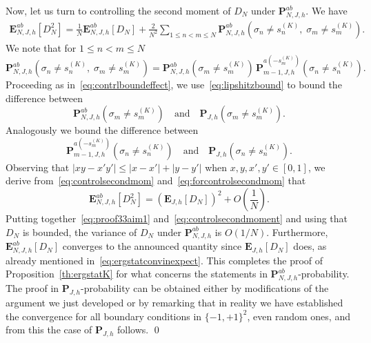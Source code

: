 \documentclass[AHL,Unicode,longabstracts,published]{cedram}
\newcommand{\bP}{\mathbf{P}}
\newcommand{\bE}{\mathbf{E}}
\newcommand{\gs}{\sigma}
\begin{document}
Now, let us turn to controlling the second moment of $D_N$ under $\bP^{ab}_{ N, J, h}$. We have
\begin{equation}\label{eq:controlsecondmom}
\begin{aligned}
\bE^{ab}_{N, J, h}\left[D_N^2\right]=\frac1N\bE^{ab}_{N, J, h}[D_N]+\frac2{N^2}\sum_{1 \le n < m\le N} \bP^{ab}_{N, J, h}\left(\gs_n \neq s^{(K)}_n,\; \gs_m \neq s^{(K)}_m\right).
\end{aligned}
\end{equation}
We note that for $1 \le n < m\le N$
\begin{equation}\label{eq:forcontrolsecondmom}
\bP_{ N, J, h}^{ab}\left(\gs_n \neq s^{(K)}_n,\;  \gs_m \neq s^{(K)}_m\right)
=
\bP_{N, J, h}^{ab}\left(\gs_m \neq s^{(K)}_m\right)
\, \bP_{m-1, J, h}^{a\left(-s^{(K)}_m\right)}\left(\gs_n \neq s^{(K)}_n\right).
\end{equation}
Proceeding as in~\eqref{eq:contrlboundeffect}, we use~\eqref{eq:lipshitzbound} to bound the difference between
\[
\bP_{N, J, h}^{ab}\left(\gs_m \neq s^{(K)}_m\right)\quad\text{and}\quad\bP_{J, h}\left(\gs_m \neq s^{(K)}_m\right).
\]
Analogously we bound the difference between 
\[
\bP_{m-1, J, h}^{a\left(-s^{(K)}_m\right)}\left(\gs_n \neq s^{(K)}_n\right)\quad\text{and}\quad \bP_{J, h}\left(\gs_n \neq s^{(K)}_n\right).
\]
Observing that $|xy-x'y'|\le |x-x'|+|y-y'|$ when $x,y, x', y'\in [0, 1]$, we derive from~\eqref{eq:controlsecondmom} and~\eqref{eq:forcontrolsecondmom} that
\begin{equation}\label{eq:controlsecondmoment}
\bE^{ab}_{N, J, h}\left[D_N^2\right]=\left(\bE_{J, h}\left[D_N\right]\right)^2+O\left(\frac1N\right).
\end{equation}
Putting together~\eqref{eq:proof33aim1} and~\eqref{eq:controlsecondmoment} and using that $D_N$ is bounded, the variance of $D_N$ under $\bP^{ab}_{ N, J, h}$ is $O\left(1/N\right)$. Furthermore, $\bE^{ab}_{N, J, h}[D_N]$ converges to the announced quantity since $\bE_{J, h}[D_N]$ does, as already mentioned in~\eqref{eq:ergstatconvinexpect}. This completes the proof of Proposition~\ref{th:ergstatK} for what concerns the statements in $\bP_{N,J, h}^{ab}$-probability. The proof in $\bP_{J, h}$-probability can be obtained either by modifications of the argument we just developed or by remarking that in reality we have established the convergence for all boundary conditions in $\{-1, +1\}^2$, even random ones, and from this the case of $\bP_{J, h}$ follows.
\qed


\appendix
\end{document}
